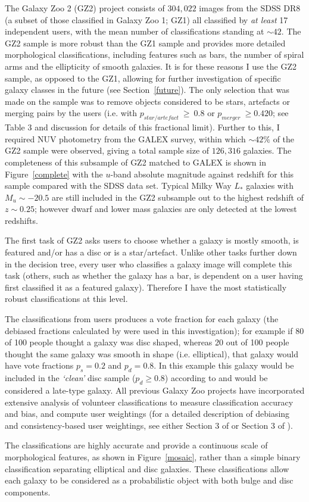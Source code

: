The Galaxy Zoo 2 (GZ2) project consists of $304, 022$ images from the SDSS DR8 (a subset of those classified in Galaxy Zoo 1; GZ1) all classified by \emph{at least} 17 independent users, with the mean number of classifications standing at $\sim42$. The GZ2 sample is more robust than the GZ1 sample and provides more detailed morphological classifications, including features such as bars, the number of spiral arms and the ellipticity of smooth galaxies. It is for these reasons I use the GZ2 sample, as opposed to the GZ1, allowing for further investigation of specific galaxy classes in the future (see Section~\ref{future}). The only selection that was made on the sample was to remove objects considered to be stars, artefacts or merging pairs by the users (i.e. with $p_{star/artefact} ~\geq~ 0.8$ or $p_{merger} ~\geq 0.420$; see \citealt{GZ2} Table 3 and discussion for details of this fractional limit). Further to this, I required NUV photometry from the GALEX survey, within which $\sim42\%$ of the GZ2 sample were observed, giving a total sample size of $126, 316$ galaxies. The completeness of this subsample of GZ2 matched to GALEX is shown in Figure~\ref{complete} with the $u$-band absolute magnitude against redshift for this sample compared with the SDSS data set. Typical Milky Way $L_*$ galaxies with $M_u \sim -20.5$ are still included in the GZ2 subsample out to the highest redshift of $z \sim 0.25$; however dwarf and lower mass galaxies are only detected at the lowest redshifts.

The first task of GZ2 asks users to choose whether a galaxy is mostly smooth, is featured and/or has a disc or is a star/artefact. Unlike other tasks further down in the decision tree, every user who classifies a galaxy image will complete this task (others, such as whether the galaxy has a bar, is dependent on a user having first classified it as a featured galaxy). Therefore I have the most statistically robust classifications at this level.

The classifications from users produces a vote fraction for each galaxy (the debiased fractions calculated by \citet{GZ2} were used in this investigation); for example if 80 of 100 people thought a galaxy was disc shaped, whereas 20 out of 100 people thought the same galaxy was smooth in shape (i.e. elliptical), that galaxy would have vote fractions $p_{s} = 0.2$ and $p_{d} = 0.8$. In this example this galaxy would be included in the \emph{`clean'} disc sample ($p_d \geq 0.8$) according to \cite{GZ2} and would be considered a late-type galaxy. All previous Galaxy Zoo projects have incorporated extensive analysis of volunteer classifications to measure classification accuracy and bias, and compute user weightings (for a detailed description of debiasing and consistency-based user weightings, see either Section 3 of \citealt{Lintott09} or Section 3 of \citealt{GZ2}). 

The classifications are highly accurate and provide a continuous scale of morphological features, as shown in Figure~\ref{mosaic}, rather than a simple binary classification separating elliptical and disc galaxies. These classifications allow each galaxy to be considered as a probabilistic object with both bulge and disc components. 
